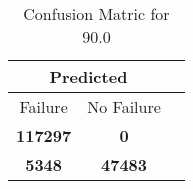 \begin{table}[] 
\caption{Confusion Matric for 90.0} 
\label{Table: Prediction Accuracy-DMD90.0OnlySunEKF-combinationReflectionperfectNoFailurePrediction-Reflection} 
\centering 
\begin{tabular} 
 {@{}ccc@{}} 
\toprule 
\multicolumn{2}{c}{\textbf{Predicted}}
 \\ \midrule 
\multicolumn{1}{|c|}{Failure} & 
\multicolumn{1}{c|}{No Failure}
 \\ \midrule 
\multicolumn{1}{|c|}{\color{green}\textbf{117297}} & 
\multicolumn{1}{c|}{\color{red}\textbf{0}}
 \\ \midrule 
\multicolumn{1}{|c|}{\color{red}\textbf{5348}} & 
\multicolumn{1}{c|}{\color{green}\textbf{47483}}
 \\ \bottomrule 
\end{tabular} 
\end{table} 
